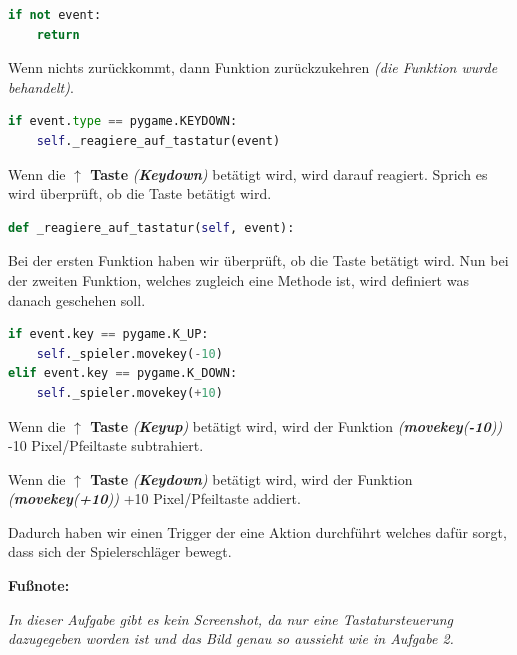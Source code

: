 \documentclass[a4paper,12pt]{article}
\begin{document}
\clearpage
\begin{lstlisting}[language=Python, captionpos=b, caption={Aufgabe 3: Event-Handling}, label=lst:aufgabe-3-event-handling]
if not event:
    return
\end{lstlisting}
\par \vspace\baselineskip
Wenn nichts zurückkommt, dann Funktion zurückzukehren \textit{(die Funktion wurde behandelt)}. \par \vspace\baselineskip
\begin{lstlisting}[language=Python, captionpos=b, caption={Aufgabe 3: KEYDOWN Prüfung}, label=lst:aufgabe-3-keydown-pruefung]
if event.type == pygame.KEYDOWN:
    self._reagiere_auf_tastatur(event)
\end{lstlisting}
\par \vspace\baselineskip
Wenn die \textbf{$\uparrow$ Taste} \textit{(\textbf{Keydown})} betätigt wird, wird darauf reagiert. Sprich es wird überprüft, ob die Taste betätigt wird. \par \vspace\baselineskip
\begin{lstlisting}[language=Python, captionpos=b, caption={Aufgabe 3: \_reagiere\_auf\_tastatur(self,event)}, label=lst:aufgabe-3-reagiere-auf-tastatur-self-event]
def _reagiere_auf_tastatur(self, event):
\end{lstlisting}
\par \vspace\baselineskip
Bei der ersten Funktion haben wir überprüft, ob die Taste betätigt wird. Nun bei der zweiten Funktion, welches zugleich eine Methode ist, wird definiert was danach geschehen soll. \par \vspace\baselineskip
\begin{lstlisting}[language=Python, captionpos=b, caption={Aufgabe 3: Tastensteuerung}, label=lst:aufgabe-3-tastensteuerung]
if event.key == pygame.K_UP:
    self._spieler.movekey(-10)
elif event.key == pygame.K_DOWN:
    self._spieler.movekey(+10)
\end{lstlisting}
\par \vspace\baselineskip
Wenn die \textbf{$\uparrow$ Taste} \textit{(\textbf{Keyup})} betätigt wird, wird der Funktion \textit{(\textbf{movekey}(\textbf{-10}))} -10 Pixel/Pfeiltaste subtrahiert. \par Wenn die \textbf{$\uparrow$ Taste} \textit{(\textbf{Keydown})} betätigt wird, wird der Funktion \textit{(\textbf{movekey}(\textbf{+10}))} +10 Pixel/Pfeiltaste addiert. \par \vspace\baselineskip Dadurch haben wir einen Trigger der eine Aktion durchführt welches dafür sorgt, dass sich der Spielerschläger bewegt. \par \vspace\baselineskip
\noindent
\textbf{Fußnote:} \par
\textit{In dieser Aufgabe gibt es kein Screenshot, da nur eine Tastatursteuerung dazugegeben worden ist und das Bild genau so aussieht wie in Aufgabe 2.}
\clearpage
\end{document}
